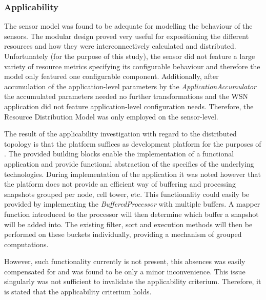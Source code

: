 \subsubsection{Applicability}
The sensor model was found to be adequate for modelling the behaviour of the \sensit sensors. The modular design proved very useful for expositioning the different resources and how they were interconnectively calculated and distributed. Unfortunately (for the purpose of this study), the sensor did not feature a large variety of resource metrics specifying its configurable behaviour and therefore the model only featured one configurable component. Additionally, after accumulation of the application-level parameters by the \emph{ApplicationAccumulator} the accumulated parameters needed no further transformations and the WSN application did not feature application-level configuration needs. Therefore, the Resource Distribution Model was only employed on the sensor-level.

The result of the applicability investigation with regard to the distributed topology is that the platform suffices as development platform for the purposes of \nedap\idsystemsnospace. The provided building blocks enable the implementation of a functional application and provide functional abstraction of the specifics of the underlying technologies. During implementation of the application it was noted however that the platform does not provide an efficient way of buffering and processing snapshots grouped per node, cell tower, etc. This functionality could easily be provided by implementing the \emph{BufferedProcessor} with multiple buffers. A mapper function introduced to the processor will then determine which buffer a snapshot will be added into. The existing filter, sort and execution methods will then be performed on these buckets individually, providing a mechanism of grouped computations.

However, such functionality currently is not present, this absences was easily compensated for and was found to be only a minor inconvenience. This issue singularly was not sufficient to invalidate the applicability criterium. Therefore, it is stated that the applicability criterium holds.

